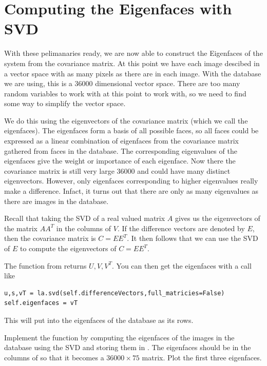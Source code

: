 \section*{Computing the Eigenfaces with SVD}

With these pelimanaries ready, we are now able to construct the Eigenfaces of the system from the covariance matrix.
At this point we have each image descibed in a vector space with as many pixels as there are in each image.
With the database we are using, this is a 36000 dimensional vector space.
There are too many random variables to work with at this point to work with, so we need to find some way to simplify the vector space.

We do this using the eigenvectors of the covariance matrix (which we call the eigenfaces).
The eigenfaces form a basis of all possible faces, so all faces could be expressed as a linear combination of eigenfaces from the covariance matrix gathered from faces in the database.
The corresponding eigenvalues of the eigenfaces give the weight or importance of each eigenface.
Now there the covariance matrix is still very large 36000 and could have many distinct eigenvectors.
However, only eigenfaces corresponding to higher eigenvalues really make a difference.
Infact, it turns out that there are only as many eigenvalues as there are images in the database.

Recall that taking the SVD of a real valued matrix $A$ gives us the eigenvectors of the matrix $AA^T$ in the columns of $V$.
If the difference vectors are denoted by $E$, then the covariance matrix is $C = EE^T$.
It then follows that we can use the SVD of $E$ to compute the eigenvectors of $C = EE^T$.

The  function from  returns $U,V,V^T$. You can then get the eigenfaces with a call like
\begin{lstlisting}
u,s,vT = la.svd(self.differenceVectors,full_matricies=False)
self.eigenfaces = vT
\end{lstlisting}
This will put into  the eigenfaces of the database as its rows.

\begin{problem}
Implement the function  by computing the eigenfaces of the images in the database using the SVD and storing them in .
The eigenfaces should be in the columns of  so that it becomes a $36000 \times 75$ matrix.
Plot the first three eigenfaces.
\end{problem}

